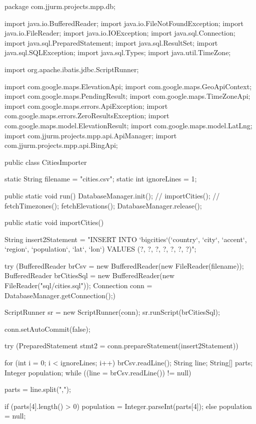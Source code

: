 \begin{javacode}
package com.jjurm.projects.mpp.db;

import java.io.BufferedReader;
import java.io.FileNotFoundException;
import java.io.FileReader;
import java.io.IOException;
import java.sql.Connection;
import java.sql.PreparedStatement;
import java.sql.ResultSet;
import java.sql.SQLException;
import java.sql.Types;
import java.util.TimeZone;

import org.apache.ibatis.jdbc.ScriptRunner;

import com.google.maps.ElevationApi;
import com.google.maps.GeoApiContext;
import com.google.maps.PendingResult;
import com.google.maps.TimeZoneApi;
import com.google.maps.errors.ApiException;
import com.google.maps.errors.ZeroResultsException;
import com.google.maps.model.ElevationResult;
import com.google.maps.model.LatLng;
import com.jjurm.projects.mpp.api.ApiManager;
import com.jjurm.projects.mpp.api.BingApi;

public class CitiesImporter {

  static String filename = "cities.csv";
  static int ignoreLines = 1;

  public static void run() {
    DatabaseManager.init();
    // importCities();
    // fetchTimezones();
    fetchElevations();
    DatabaseManager.release();
  }

  public static void importCities() {

    String insert2Statement =
        "INSERT INTO `bigcities`(`country`, `city`, `accent`, `region`, `population`, `lat`, `lon`) VALUES (?, ?, ?, ?, ?, ?, ?)";

    try (BufferedReader brCsv = new BufferedReader(new FileReader(filename));
        BufferedReader brCitiesSql = new BufferedReader(new FileReader("sql/cities.sql"));
        Connection conn = DatabaseManager.getConnection();) {

      ScriptRunner sr = new ScriptRunner(conn);
      sr.runScript(brCitiesSql);

      conn.setAutoCommit(false);

      try (PreparedStatement stmt2 = conn.prepareStatement(insert2Statement)) {

        for (int i = 0; i < ignoreLines; i++) {
          brCsv.readLine();
        }
        String line;
        String[] parts;
        Integer population;
        while ((line = brCsv.readLine()) != null) {
          parts = line.split(",");

          if (parts[4].length() > 0) {
            population = Integer.parseInt(parts[4]);
          } else {
            population = null;
          }

}}}}}
\end{javacode}
